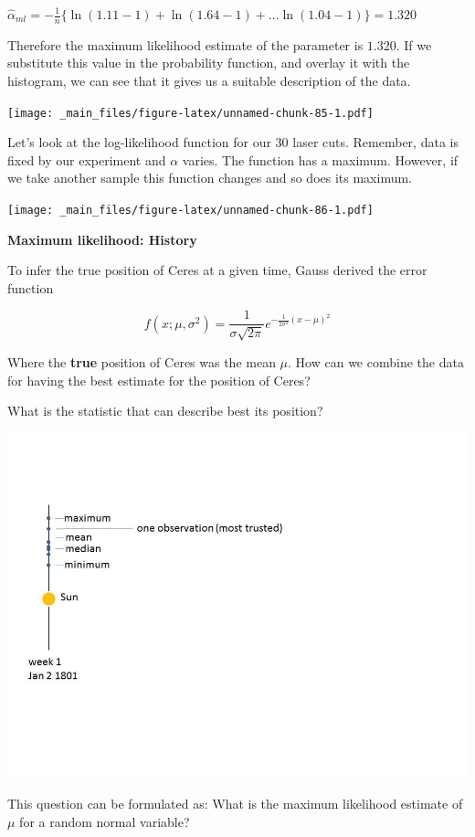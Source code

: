 \documentclass[
]{book}
\begin{document}
\(\hat{\alpha}_{ml}=-\frac{1}{n}\{ \ln (1.11-1)+ \ln (1.64-1)+...\ln (1.04-1)\}=1.320\)

Therefore the maximum likelihood estimate of the parameter is \(1.320\). If we substitute this value in the probability function, and overlay it with the histogram, we can see that it gives us a suitable description of the data.

\texttt{[image: \_main\_files/figure-latex/unnamed-chunk-85-1.pdf]}

Let's look at the log-likelihood function for our \(30\) laser cuts. Remember, data is fixed by our experiment and \(\alpha\) varies. The function has a maximum. However, if we take another sample this function changes and so does its maximum.

\texttt{[image: \_main\_files/figure-latex/unnamed-chunk-86-1.pdf]}

\textbf{Maximum likelihood: History}

To infer the true position of Ceres at a given time, Gauss derived the error function

\[f(x; \mu, \sigma^2)= \frac{1}{\sigma \sqrt{2 \pi}} e^{-\frac{1}{2\sigma^2} (x-\mu)^2}\]

Where the \textbf{true} position of Ceres was the mean \(\mu\). How can we combine the data for having the best estimate for the position of Ceres?

What is the statistic that can describe best its position?

\includegraphics{./figures/cerestime.JPG}

This question can be formulated as: What is the maximum likelihood estimate of \(\mu\) for a random normal variable?
\end{document}
